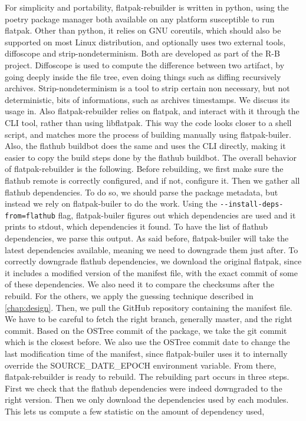 \documentclass[a4paper,11pt,oneside]{report}
\theoremstyle{definition}
\newcommand{\sysname}{flatpak-rebuilder\xspace}
\newcommand{\fp}{flatpak\xspace}
\newcommand{\fh}{flathub\xspace}
\newcommand{\fb}{flatpak-builer\xspace}
\newcommand{\sde}{SOURCE\_DATE\_EPOCH\xspace}
\newcommand{\fhbb}{flathub buildbot\xspace}
\begin{document}
For simplicity and portability, \sysname is written in python, using the poetry
package manager both available on any platform susceptible to run \fp. Other
than python, it relies on GNU coreutils, which should also be supported on most
Linux distribution, and optionally uses two external tools, diffoscope and
strip-nondeterminism. Both are developed as part of the R-B project. Diffoscope
is used to compute the difference between two artifact, by going deeply inside
the file tree, even doing things such as diffing recursively archives.
Strip-nondeterminism is a tool to strip certain non necessary, but not
deterministic, bits of informations, such as archives timestamps. We discuss
its usage in. Also \sysname relies on \fp, and interact with it through the CLI
tool, rather than using libflatpak. This way the code looks closer to a shell
script, and matches more the process of building manually using \fb. Also, the
\fhbb does the same and uses the CLI directly, making it easier to copy the
build steps done by the \fhbb. The overall behavior of \sysname is the
following. Before rebuilding, we first make sure the \fh remote is correctly
configured, and if not, configure it. Then we gather all \fh dependencies. To
do so, we should parse the package metadata, but instead we rely on \fb to do
the work. Using the \verb|--install-deps-from=flathub| flag, \fb figures out
which dependencies are used and it prints to stdout, which dependencies it
found. To have the list of \fh dependencies, we parse this output. As said
before, \fb will take the latest dependencies available, meaning we need to
downgrade them just after. To correctly downgrade \fh dependencies, we download
the original \fp, since it includes a modified version of the manifest file,
with the exact commit of some of these dependencies. We also need it to compare
the checksums after the rebuild. For the others, we apply the guessing
technique described in \autoref{chap:design}. Then, we pull the GitHub
repository containing the manifest file. We have to be careful to fetch the
right branch, generally master, and the right commit. Based on the OSTree
commit of the package, we take the git commit which is the closest before. We
also use the OSTree commit date to change the last modification time of the
manifest, since \fb uses it to internally override the \sde environment
variable. From there, \sysname is ready to rebuild. The rebuilding part occurs
in three steps. First we check that the \fh dependencies were indeed downgraded
to the right version. Then we only download the dependencies used by each
modules. This lets us compute a few statistic on the amount of dependency used,
\end{document}
